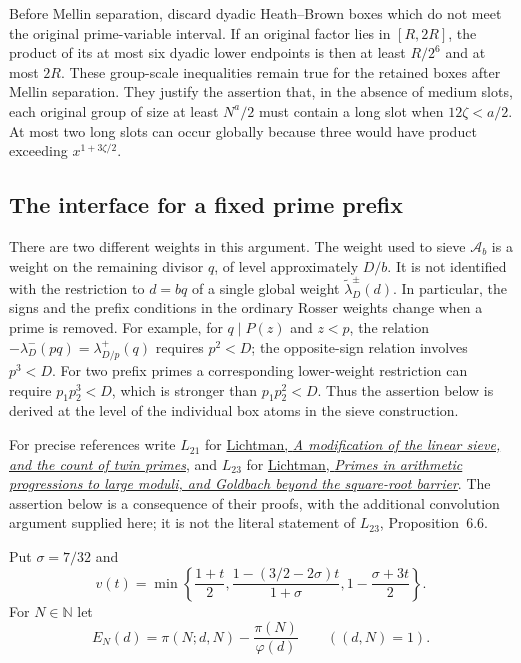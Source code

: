 \documentclass[11pt]{article}
\begin{document}
Before Mellin separation, discard dyadic Heath--Brown boxes
which do not meet the original prime-variable interval.
If an original factor lies in $[R,2R]$, the product of its
at most six dyadic lower endpoints is then at least
$R/2^6$ and at most $2R$.
These group-scale inequalities remain true for the retained
boxes after Mellin separation.
They justify the assertion that, in the absence of medium
slots, each original group of size at least $N^a/2$
must contain a long slot when $12\zeta<a/2$.
At most two long slots can occur globally because three
would have product exceeding $x^{1+3\zeta/2}$.

\subsection{The interface for a fixed prime prefix}
\label{sec:prefix-interface}

There are two different weights in this argument. The weight used to
sieve $\mathcal A_b$ is a weight on the remaining divisor $q$, of level
approximately $D/b$. It is not identified with the restriction to
$d=bq$ of a single global weight $\widetilde\lambda_D^{\pm}(d)$.
In particular, the signs and the prefix conditions in the ordinary
Rosser weights change when a prime is removed. For example, for
$q\mid P(z)$ and $z<p$, the relation
$-\lambda_D^-(pq)=\lambda_{D/p}^+(q)$ requires $p^2<D$;
the opposite-sign relation involves $p^3<D$.
For two prefix primes a corresponding lower-weight restriction
can require $p_1p_2^3<D$, which is stronger than
$p_1p_2^2<D$. Thus the assertion below is derived at the level of
the individual box atoms in the sieve construction.

For precise references write $L_{21}$ for
\href{https://arxiv.org/pdf/2109.02851v2}{Lichtman,
\emph{A modification of the linear sieve, and the count of twin primes}},
and $L_{23}$ for
\href{https://arxiv.org/pdf/2309.08522v1}{Lichtman,
\emph{Primes in arithmetic progressions to large moduli, and Goldbach
beyond the square-root barrier}}.
The assertion below is a consequence of their proofs, with the
additional convolution argument supplied here; it is not the literal
statement of $L_{23}$, Proposition~6.6.

Put $\sigma=7/32$ and
\begin{equation}\label{eq:prefix-v}
 v(t)=\min\left\{\frac{1+t}{2},
       \frac{1-(3/2-2\sigma)t}{1+\sigma},
       1-\frac{\sigma+3t}{2}\right\}.
\end{equation}
For $N\in\mathbb N$ let
\[
 E_N(d)=\pi(N;d,N)-\frac{\pi(N)}{\varphi(d)}
 \qquad ((d,N)=1).
\]
\end{document}
